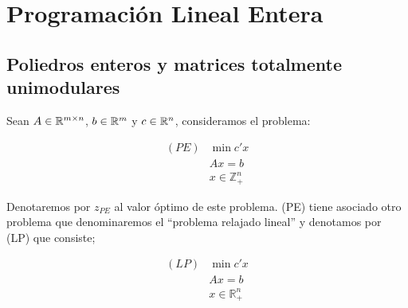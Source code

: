 \documentclass[PM.tex]{subfiles}
\begin{document}
\chapter{Programación Lineal Entera}

\section{Poliedros enteros y matrices totalmente unimodulares}
Sean $A \in \mathbb{R}^{m \times n}$, $b\in\mathbb{R}^m$ y $c\in\mathbb{R}^n$, consideramos el problema:

\begin{align*}
(PE) & \min c'x\\
	 & A x = b\\
	 & x \in \mathbb{Z}_+^n
\end{align*}

Denotaremos por $z_{PE}$ al valor óptimo de este problema. (PE) tiene asociado otro problema que denominaremos el ``problema relajado lineal'' y denotamos por (LP) que consiste;

\begin{align*}
(LP) & \min c'x\\
	 & A x = b\\
	 & x \in \mathbb{R}_+^n
\end{align*}
\end{document}
